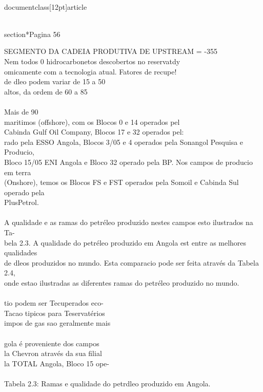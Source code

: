 \\documentclass[12pt]{article}
\begin{document}
\\section*{Pagina 56}

SEGMENTO DA CADEIA PRODUTIVA DE UPSTREAM = -355\\
Nem todos 0 hidrocarbonetos descobertos no reservatdy\\
omicamente com a tecnologia atual. Fatores de recupe!\\
de dleo podem variar de 15 a 50\\%
altos, da ordem de 60 a 85\\%
\\
Mais de 90\\%
maritimos (offshore), com os Blocos 0 e 14 operados pel\\
Cabinda Gulf Oil Company, Blocos 17 e 32 operados pel:\\
rado pela ESSO Angola, Blocos 3/05 e 4 operados pela Sonangol Pesquisa e Producio,\\
Bloco 15/05 ENI Angola e Bloco 32 operado pela BP. Nos campos de producio em terra\\
(Onshore), temos os Blocos FS e FST operados pela Somoil e Cabinda Sul operado pela\\
PlusPetrol.\\
\\
A qualidade e as ramas do petréleo produzido nestes campos esto ilustrados na Ta-\\
bela 2.3. A qualidade do petréleo produzido em Angola est entre as melhores qualidades\\
de dleos produzidos no mundo. Esta comparacio pode ser feita através da Tabela 2.4,\\
onde estao ilustradas as diferentes ramas do petréleo produzido no mundo.\\
\\
tio podem ser Tecuperados eco-\\
Tacao tipicos para Teservatérios\\
impos de gas sao geralmente mais\\
\\
gola é proveniente dos campos\\
la Chevron através da sua filial\\
la TOTAL Angola, Bloco 15 ope-\\
\\
Tabela 2.3: Ramas e qualidade do petrdleo produzido em Angola.\\
\end{document}
